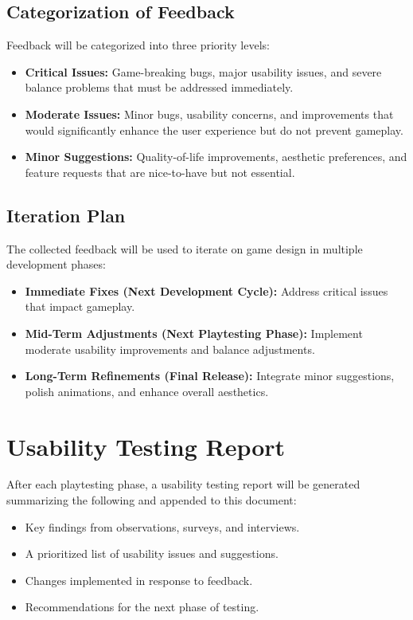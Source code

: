 \documentclass{article}
\begin{document}
\subsection{Categorization of Feedback}
Feedback will be categorized into three priority levels:
\begin{itemize}
    \item \textbf{Critical Issues:} Game-breaking bugs, major usability issues, and severe balance problems that must be addressed immediately.
    \item \textbf{Moderate Issues:} Minor bugs, usability concerns, and improvements that would significantly enhance the user experience but do not prevent gameplay.
    \item \textbf{Minor Suggestions:} Quality-of-life improvements, aesthetic preferences, and feature requests that are nice-to-have but not essential.
\end{itemize}

\subsection{Iteration Plan}
The collected feedback will be used to iterate on game design in multiple development phases:
\begin{itemize}
    \item \textbf{Immediate Fixes (Next Development Cycle):} Address critical issues that impact gameplay.
    \item \textbf{Mid-Term Adjustments (Next Playtesting Phase):} Implement moderate usability improvements and balance adjustments.
    \item \textbf{Long-Term Refinements (Final Release):} Integrate minor suggestions, polish animations, and enhance overall aesthetics.
\end{itemize}

\newpage

\section{Usability Testing Report}
After each playtesting phase, a usability testing report will be generated summarizing the following and appended to this document:
\begin{itemize}
    \item Key findings from observations, surveys, and interviews.
    \item A prioritized list of usability issues and suggestions.
    \item Changes implemented in response to feedback.
    \item Recommendations for the next phase of testing.
\end{itemize}
\end{document}
